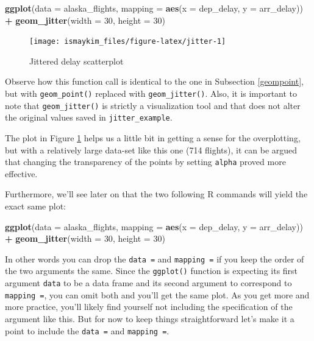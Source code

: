 \documentclass[12pt,]{krantz}
\makeatletter
\newenvironment{Shaded}{\begin{snugshade}}{\end{snugshade}}
\newcommand{\KeywordTok}[1]{\textcolor[rgb]{0.27,0.27,0.27}{\textbf{#1}}}
\newcommand{\DataTypeTok}[1]{\textcolor[rgb]{0.27,0.27,0.27}{#1}}
\newcommand{\DecValTok}[1]{\textcolor[rgb]{0.06,0.06,0.06}{#1}}
\newcommand{\StringTok}[1]{\textcolor[rgb]{0.5,0.5,0.5}{#1}}
\newcommand{\OperatorTok}[1]{\textcolor[rgb]{0.43,0.43,0.43}{\textbf{#1}}}
\newcommand{\NormalTok}[1]{#1}
\newenvironment{kframe}{%
\medskip{}
\setlength{\fboxsep}{.8em}
 \def\at@end@of@kframe{}%
 \ifinner\ifhmode%
  \def\at@end@of@kframe{\end{minipage}}%
  \begin{minipage}{\columnwidth}%
 \fi\fi%
 \def\FrameCommand##1{\hskip\@totalleftmargin \hskip-\fboxsep
 \colorbox{shadecolor}{##1}\hskip-\fboxsep
     \hskip-\linewidth \hskip-\@totalleftmargin \hskip\columnwidth}%
 \MakeFramed {\advance\hsize-\width
   \@totalleftmargin\z@ \linewidth\hsize
   \@setminipage}}%
 {\par\unskip\endMakeFramed%
 \at@end@of@kframe}
\renewenvironment{Shaded}{\begin{kframe}}{\end{kframe}}
\theoremstyle{definition}
\theoremstyle{definition}
\theoremstyle{definition}
\theoremstyle{remark}
\makeatother
\begin{document}
\begin{Shaded}
\begin{Highlighting}[]
\KeywordTok{ggplot}\NormalTok{(}\DataTypeTok{data =}\NormalTok{ alaska_flights, }
       \DataTypeTok{mapping =} \KeywordTok{aes}\NormalTok{(}\DataTypeTok{x =}\NormalTok{ dep_delay, }\DataTypeTok{y =}\NormalTok{ arr_delay)) }\OperatorTok{+}\StringTok{ }
\StringTok{  }\KeywordTok{geom_jitter}\NormalTok{(}\DataTypeTok{width =} \DecValTok{30}\NormalTok{, }\DataTypeTok{height =} \DecValTok{30}\NormalTok{)}
\end{Highlighting}
\end{Shaded}

\begin{figure}

{\centering \texttt{[image: ismaykim\_files/figure-latex/jitter-1]} 

}

\caption{Jittered delay scatterplot}\label{fig:jitter}
\end{figure}

Observe how this function call is identical to the one in Subsection
\ref{geompoint}, but with \texttt{geom\_point()} replaced with
\texttt{geom\_jitter()}. Also, it is important to note that
\texttt{geom\_jitter()} is strictly a visualization tool and that does
not alter the original values saved in \texttt{jitter\_example}.

The plot in Figure \ref{fig:jitter} helps us a little bit in getting a
sense for the overplotting, but with a relatively large data-set like
this one (714 flights), it can be argued that changing the transparency
of the points by setting \texttt{alpha} proved more effective.

Furthermore, we'll see later on that the two following R commands will
yield the exact same plot:

\begin{Shaded}
\begin{Highlighting}[]
\KeywordTok{ggplot}\NormalTok{(}\DataTypeTok{data =}\NormalTok{ alaska_flights, }
       \DataTypeTok{mapping =} \KeywordTok{aes}\NormalTok{(}\DataTypeTok{x =}\NormalTok{ dep_delay, }\DataTypeTok{y =}\NormalTok{ arr_delay)) }\OperatorTok{+}\StringTok{ }
\StringTok{  }\KeywordTok{geom_jitter}\NormalTok{(}\DataTypeTok{width =} \DecValTok{30}\NormalTok{, }\DataTypeTok{height =} \DecValTok{30}\NormalTok{)}
\end{Highlighting}
\end{Shaded}

In other words you can drop the \texttt{data\ =} and \texttt{mapping\ =}
if you keep the order of the two arguments the same. Since the
\texttt{ggplot()} function is expecting its first argument \texttt{data}
to be a data frame and its second argument to correspond to
\texttt{mapping\ =}, you can omit both and you'll get the same plot. As
you get more and more practice, you'll likely find yourself not
including the specification of the argument like this. But for now to
keep things straightforward let's make it a point to include the
\texttt{data\ =} and \texttt{mapping\ =}.
\end{document}
